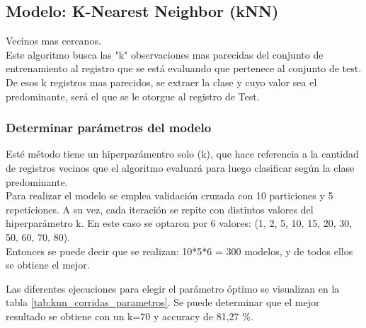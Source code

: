 \subsection{Modelo: K-Nearest Neighbor (kNN)}
Vecinos mas cercanos.\\

Este algoritmo busca las "k" observaciones mas parecidas del conjunto de entrenamiento al registro que se está evaluando que pertenece al conjunto de test. De esos k registros mas parecidos, se extraer la clase y cuyo valor sea el predominante, será el que se le otorgue al registro de Test.


\subsubsection{Determinar parámetros del modelo}
Esté método tiene un hiperparámentro solo (k), que hace referencia a la cantidad de registros vecinos que el algoritmo evaluará para luego clasificar según la clase predominante.\\

Para realizar el modelo se emplea validación cruzada con 10 particiones y 5 repeticiones. A su vez, cada iteración se repite con distintos valores del hiperparámetro k. En este caso se optaron por 6 valores: (1, 2, 5, 10, 15, 20, 30, 50, 60, 70, 80).\\
Entonces se puede decir que se realizan: 10*5*6 = 300 modelos, y de todos ellos se obtiene el mejor.

Las diferentes ejecuciones para elegir el parámetro óptimo se visualizan en la tabla \ref{tab:knn_corridas_parametros}.
Se puede determinar que el mejor resultado se obtiene con un k=70 y accuracy de 81,27 \%.


